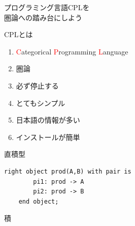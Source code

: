 \documentclass[pdflatex,12pt]{beamer}
\begin{document}
\begin{frame}
    \centering
\end{frame}

\begin{frame}
    \centering
\end{frame}

\begin{frame}
    \centering
    \Huge
    プログラミング言語CPLを \\ 圏論への踏み台にしよう
\end{frame}

\begin{frame}{CPLとは}
    \Large
    \begin{enumerate}
        \item \textcolor{red}Categorical \textcolor{red}Programming \textcolor{red}Language
        \item 圏論
        \item 必ず停止する
        \item とてもシンプル
        \item 日本語の情報が多い
        \item インストールが簡単 \\ 
    \end{enumerate}
\end{frame}

\begin{frame}
    \centering
\end{frame}

\begin{frame}
    \centering
\end{frame}

\begin{frame}[fragile]{直積型}
    \centering
    \begin{lstlisting}[basicstyle=\ttfamily]
    right object prod(A,B) with pair is
        pi1: prod -> A
        pi2: prod -> B
    end object;
    \end{lstlisting}
\end{frame}

\begin{frame}[fragile]{積}
\end{frame}
\end{document}
